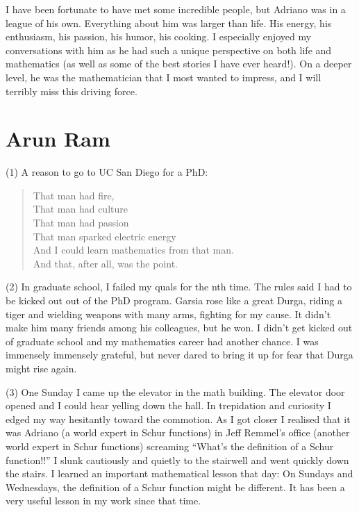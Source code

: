 \documentclass{notices}
\begin{document}
I have been fortunate to have met some incredible people, but Adriano was in a league of his own. Everything about him was larger than life. His energy, his enthusiasm, his passion, his humor, his cooking. I especially enjoyed my conversations with him as he had such a unique perspective  on both life and  mathematics (as well as some of the best stories I have ever heard!). On a deeper level, he was the mathematician that I most wanted to impress, and I will terribly miss this driving force.

\section*{Arun Ram}
(1)  A reason to go to UC San Diego for a PhD:
\begin{quote}
That man had fire,\\
That man had culture\\
That man had passion\\
That man sparked electric energy\\
And I could learn mathematics from that man.\\
And that, after all, was the point.
\end{quote}

(2) In graduate school, I failed my quals for the nth time.  
The rules said I had to be kicked out out of the PhD program.
Garsia rose like a great Durga,
riding a tiger and wielding weapons with many arms,
fighting for my cause.  
It didn't make him many friends among his colleagues, but he won.
I didn't get kicked out of graduate school and
my mathematics career had another chance.
I was immensely immensely grateful,
but never dared to bring it up
for fear that Durga might rise again.

(3) One Sunday I came up the elevator in the math building.
The elevator door opened and  I could hear yelling down the hall.  
In trepidation and curiosity I edged my way hesitantly toward the commotion.  
As I got closer I realised that it was Adriano (a world expert in Schur functions)
in Jeff Remmel's office (another world expert in Schur functions)
screaming ``What's the definition of a Schur function!!''  
I slunk cautiously and quietly to the stairwell and went quickly down the stairs.
I learned an important mathematical lesson that day:
On Sundays and Wednesdays,
the definition of a Schur function might be different.
It has been a very useful lesson in my work since that time.
\end{document}
